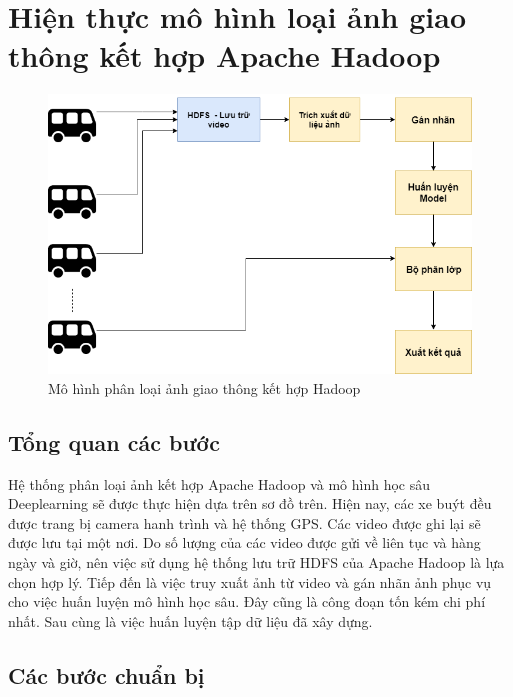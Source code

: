 \chapter{Hiện thực mô hình loại ảnh giao thông kết hợp Apache Hadoop}

\begin{figure}[h!]
		\centering
		\includegraphics[scale=0.5]{charts/usecase.png}
		\caption{Mô hình phân loại ảnh giao thông kết hợp Hadoop}
		\label{fig:usecase}
	\end{figure}

\section{Tổng quan các bước}
	Hệ thống phân loại ảnh kết hợp Apache Hadoop và mô hình học sâu Deeplearning sẽ được thực hiện dựa trên sơ đồ trên. Hiện nay, các xe buýt đều được trang bị camera hanh trình và hệ thống GPS. Các video được ghi lại sẽ được lưu tại một nơi. Do số lượng của các video được gửi về liên tục và hàng ngày và giờ, nên việc sử dụng hệ thống lưu trữ HDFS của Apache Hadoop là lựa chọn hợp lý. Tiếp đến là việc truy xuất ảnh từ video và gán nhãn ảnh phục vụ cho việc huấn luyện mô hình học sâu. Đây cũng là công đoạn tốn kém chi phí nhất. Sau cùng là việc huấn luyện tập dữ liệu đã xây dựng.

\section{Các bước chuẩn bị}
